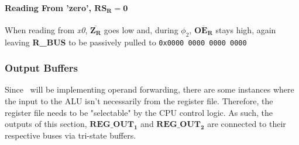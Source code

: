 \documentclass[a4paper, 11pt]{article}
\begin{document}
                \paragraph{Reading From 'zero', \(\mathbf{RS_{R}=0}\)}
                    \label{par:Regs:TheoryOp:Read:Zero}

                    When reading from \emph{x0}, \(\mathbf{\overline{Z_{R}}}\)
                    goes low and, during \(\phi_{2}\), 
                    \(\mathbf{\overline{OE_{R}}}\) stays high, again leaving
                    \textbf{R\_BUS} to be passively pulled to
                    \verb|0x0000 0000 0000 0000|

            \subsubsection{Output Buffers}\label{sec:Regs:TheoryOp:OutBuf}
               
                Since \logo\ will be implementing operand forwarding, there are
                some instances where the input to the ALU isn't necessarily from
                the register file.
                Therefore, the register file needs to be "selectable" by the CPU
                control logic.
                As such, the outputs of this section, \(\mathbf{REG\_OUT_{1}}\) 
                and \(\mathbf{REG\_OUT_{2}}\) are connected to their respective
                buses via tri-state buffers.
\end{document}
